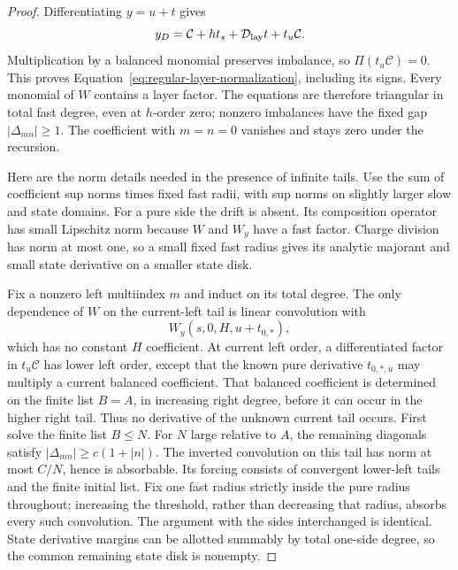 \begin{proof}
Differentiating $y=u+t$ gives
\[
 y_D=\mathcal C+h t_s+\mathcal D_{\rm lay}t+t_u\mathcal C.
\]
Multiplication by a balanced monomial preserves imbalance, so
$\Pi(t_u\mathcal C)=0$.  This proves
Equation~\eqref{eq:regular-layer-normalization}, including its signs.  Every
monomial of $W$ contains a layer factor.  The equations are therefore
triangular in total fast degree, even at $h$-order zero; nonzero
imbalances have the fixed gap $|\Delta_{mn}|\ge1$.  The coefficient with
$m=n=0$ vanishes and stays zero under the recursion.

Here are the norm details needed in the presence of infinite tails.
Use the sum of coefficient sup norms times fixed fast radii, with sup
norms on slightly larger slow and state domains.  For a pure side the
drift is absent.  Its composition operator has small Lipschitz norm
because $W$ and $W_y$ have a fast factor.  Charge division has norm at
most one, so a small fixed fast radius gives its analytic majorant and
small state derivative on a smaller state disk.

Fix a nonzero left multiindex $m$ and induct on its total degree.  The
only dependence of $W$ on the current-left tail is linear convolution
with
\[
 W_y(s,0,H,u+t_{0,*}),
\]
which has no constant $H$ coefficient.  At current left order, a
differentiated factor in $t_u\mathcal C$ has lower left order, except
that the known pure derivative $t_{0,*,u}$ may multiply a current
balanced coefficient.  That balanced coefficient is determined on the
finite list $B=A$, in increasing right degree, before it can occur in
the higher right tail.  Thus no derivative of the unknown current
tail occurs.  First solve the finite list $B\le N$.  For $N$ large
relative to $A$, the remaining diagonals satisfy
$|\Delta_{mn}|\ge c(1+|n|)$.  The inverted convolution on this tail has
norm at most $C/N$, hence is absorbable.  Its forcing consists of
convergent lower-left tails and the finite initial list.  Fix one fast
radius strictly inside the pure radius throughout; increasing the
threshold, rather than decreasing that radius, absorbs every such
convolution.  The argument with the sides interchanged is identical.
State derivative margins can be allotted summably by total one-side
degree, so the common remaining state disk is nonempty.


\end{proof}
